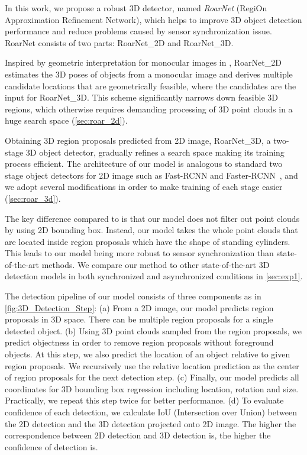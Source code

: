 \documentclass[letterpaper, 10 pt, conference]{ieeeconf}
\begin{document}
In this work, we propose a robust 3D detector, named \emph{RoarNet} (RegiOn Approximation Refinement Network), which helps to improve 3D object detection performance and reduce problems caused by sensor synchronization issue. RoarNet consists of two parts: RoarNet\_2D and RoarNet\_3D.

Inspired by geometric interpretation for monocular images in \cite{mousavian_3d_2017}, RoarNet\_2D estimates the 3D poses of objects from a monocular image and derives multiple candidate locations that are geometrically feasible, where the candidates are the input for RoarNet\_3D. This scheme significantly narrows down feasible 3D regions, which otherwise requires demanding processing of 3D point clouds in a huge search space (\cref{sec:roar_2d}).



Obtaining 3D region proposals predicted from 2D image,
RoarNet\_3D,
a two-stage 3D object detector, gradually refines a search space making its training process efficient. The architecture of our model is analogous to standard two stage object detectors for 2D image such as Fast-RCNN and Faster-RCNN~\cite{girshick_fast_2015, ren_faster_2015}, and we adopt several modifications in order to make training of each stage easier (\cref{sec:roar_3d}).

The key difference compared to \cite{qi_frustum_2018} is that our model does not filter out point clouds by using 2D bounding box. Instead, our model takes the whole point clouds that are located inside region proposals which have the shape of standing cylinders. This leads to our model being more robust to sensor synchronization than state-of-the-art methods. We compare our method to other state-of-the-art 3D detection models in both synchronized and asynchronized conditions in \cref{sec:exp1}.

The detection pipeline of our model consists of three components as in \cref{fig:3D_Detection_Step}: (a) From a 2D image, our model predicts region proposals in 3D space. There can be multiple region proposals for a single detected object. (b) Using 3D point clouds sampled from the region proposals, we predict objectness in order to remove region proposals without foreground objects. At this step, we also predict the location of an object relative to given region proposals. We recursively use the relative location prediction as the center of region proposals for the next detection step. (c) Finally, our model predicts all coordinates for 3D bounding box regression including location, rotation and size. Practically, we repeat this step twice for better performance.
(d) To evaluate confidence of each detection, we calculate IoU (Intersection over Union) between the 2D detection and the 3D detection projected onto 2D image. The higher the correspondence between 2D detection and 3D detection is, the higher the confidence of detection is.
\end{document}
